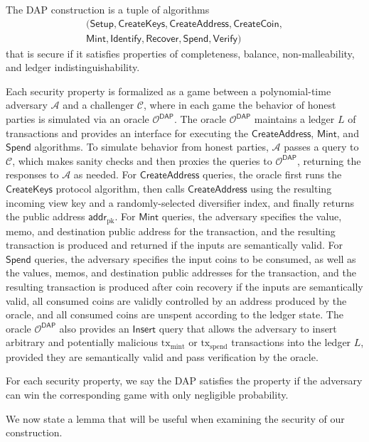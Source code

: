 \documentclass{llncs}
\newcommand{\func}[1]{\mathsf{#1}}
\newcommand{\addr}{\func{addr}}
\newcommand{\oracle}{\mathcal{O}^{\func{DAP}}}
\begin{document}
The DAP construction is a tuple of algorithms
\begin{multline*}
(\func{Setup}, \func{CreateKeys}, \func{CreateAddress}, \func{CreateCoin}, \\
\func{Mint}, \func{Identify}, \func{Recover}, \func{Spend}, \func{Verify})
\end{multline*}
that is secure if it satisfies properties of completeness, balance, non-malleability, and ledger indistinguishability.

Each security property is formalized as a game between a polynomial-time adversary $\mathcal{A}$ and a challenger $\mathcal{C}$, where in each game the behavior of honest parties is simulated via an oracle $\oracle$.
The oracle $\oracle$ maintains a ledger $L$ of transactions and provides an interface for executing the $\func{CreateAddress}$, $\func{Mint}$, and $\func{Spend}$ algorithms.
To simulate behavior from honest parties, $\mathcal{A}$ passes a query to $\mathcal{C}$, which makes sanity checks and then proxies the queries to $\oracle$, returning the responses to $\mathcal{A}$ as needed.
For $\func{CreateAddress}$ queries, the oracle first runs the $\func{CreateKeys}$ protocol algorithm, then calls $\func{CreateAddress}$ using the resulting incoming view key and a randomly-selected diversifier index, and finally returns the public address $\addr_{\text{pk}}$.
For $\func{Mint}$ queries, the adversary specifies the value, memo, and destination public address for the transaction, and the resulting transaction is produced and returned if the inputs are semantically valid.
For $\func{Spend}$ queries, the adversary specifies the input coins to be consumed, as well as the values, memos, and destination public addresses for the transaction, and the resulting transaction is produced after coin recovery if the inputs are semantically valid, all consumed coins are validly controlled by an address produced by the oracle, and all consumed coins are unspent according to the ledger state.
The oracle $\oracle$ also provides an $\func{Insert}$ query that allows the adversary to insert arbitrary and potentially malicious $\text{tx}_{\text{mint}}$ or $\text{tx}_{\text{spend}}$ transactions into the ledger $L$, provided they are semantically valid and pass verification by the oracle.

For each security property, we say the DAP satisfies the property if the adversary can win the corresponding game with only negligible probability.

We now state a lemma that will be useful when examining the security of our construction.
\end{document}

